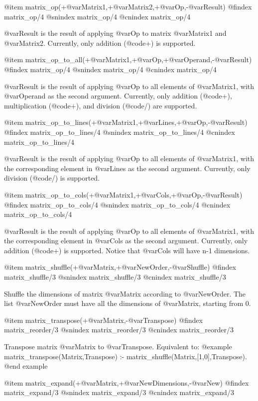 {{{{{{{{@item matrix_op(+@var{Matrix1},+@var{Matrix2},+@var{Op},-@var{Result})
@findex matrix_op/4
@snindex matrix_op/4
@cnindex matrix_op/4

@var{Result} is the result of applying @var{Op} to matrix @var{Matrix1}
and @var{Matrix2}. Currently, only addition (@code{+}) is supported.

@item matrix_op_to_all(+@var{Matrix1},+@var{Op},+@var{Operand},-@var{Result})
@findex matrix_op/4
@snindex matrix_op/4
@cnindex matrix_op/4

@var{Result} is the result of applying @var{Op} to all elements of
@var{Matrix1}, with @var{Operand} as the second argument. Currently,
only addition (@code{+}), multiplication (@code{+}), and division
(@code{/}) are supported.

@item matrix_op_to_lines(+@var{Matrix1},+@var{Lines},+@var{Op},-@var{Result})
@findex matrix_op_to_lines/4
@snindex matrix_op_to_lines/4
@cnindex matrix_op_to_lines/4

@var{Result} is the result of applying @var{Op} to all elements of
@var{Matrix1}, with the corresponding element in @var{Lines} as the
second argument. Currently, only division (@code{/}) is supported.

@item matrix_op_to_cols(+@var{Matrix1},+@var{Cols},+@var{Op},-@var{Result})
@findex matrix_op_to_cols/4
@snindex matrix_op_to_cols/4
@cnindex matrix_op_to_cols/4

@var{Result} is the result of applying @var{Op} to all elements of
@var{Matrix1}, with the corresponding element in @var{Cols} as the
second argument. Currently, only addition (@code{+}) is
supported. Notice that @var{Cols} will have n-1 dimensions.

@item matrix_shuffle(+@var{Matrix},+@var{NewOrder},-@var{Shuffle})
@findex matrix_shuffle/3
@snindex matrix_shuffle/3
@cnindex matrix_shuffle/3

Shuffle the dimensions of matrix @var{Matrix} according to
@var{NewOrder}. The list @var{NewOrder} must have all the dimensions of
@var{Matrix}, starting from 0.

@item matrix_transpose(+@var{Matrix},-@var{Transpose})
@findex matrix_reorder/3
@snindex matrix_reorder/3
@cnindex matrix_reorder/3

Transpose matrix @var{Matrix} to  @var{Transpose}. Equivalent to:
@example
matrix_transpose(Matrix,Transpose) :-
        matrix_shuffle(Matrix,[1,0],Transpose).
@end example

@item matrix_expand(+@var{Matrix},+@var{NewDimensions},-@var{New})
@findex matrix_expand/3
@snindex matrix_expand/3
@cnindex matrix_expand/3

}}}}}}}}
